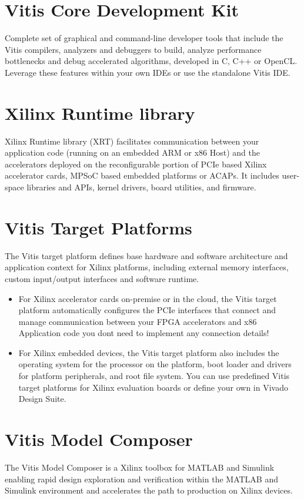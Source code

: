 \documentclass{report}
\begin{document}
	\section{Vitis Core Development Kit}
	Complete set of graphical and command-line developer tools that include the Vitis compilers, analyzers and debuggers to build, analyze performance bottlenecks and debug accelerated algorithms, developed in C, C++ or OpenCL. Leverage these features within your own IDEs or use the standalone Vitis IDE.


	\section{Xilinx Runtime library}
	Xilinx Runtime library (XRT) facilitates communication between your application code (running on an embedded ARM or x86 Host) and the accelerators deployed on the reconfigurable portion of PCIe based Xilinx accelerator cards, MPSoC based embedded platforms or ACAPs. It includes user-space libraries and APIs, kernel drivers, board utilities, and firmware. 

	\section{Vitis Target Platforms}
	The Vitis target platform defines base hardware and software architecture and application context for Xilinx platforms, including external memory interfaces, custom input/output interfaces and software runtime.

	\begin{itemize}
		\item For Xilinx accelerator cards on-premise or in the cloud, the Vitis target platform automatically configures the PCIe interfaces that connect and manage communication between your FPGA accelerators and x86 Application code you dont need to implement any connection details!
		\item For Xilinx embedded devices, the Vitis target platform also includes the operating system for the processor on the platform, boot loader and drivers for platform peripherals, and root file system. You can use predefined Vitis target platforms for Xilinx evaluation boards or define your own in Vivado Design Suite.
	\end{itemize}

	\section{Vitis Model Composer}
	The Vitis Model Composer is a Xilinx toolbox for MATLAB and Simulink enabling rapid design exploration and verification within the MATLAB and Simulink environment and accelerates the path to production on Xilinx devices.
\end{document}
